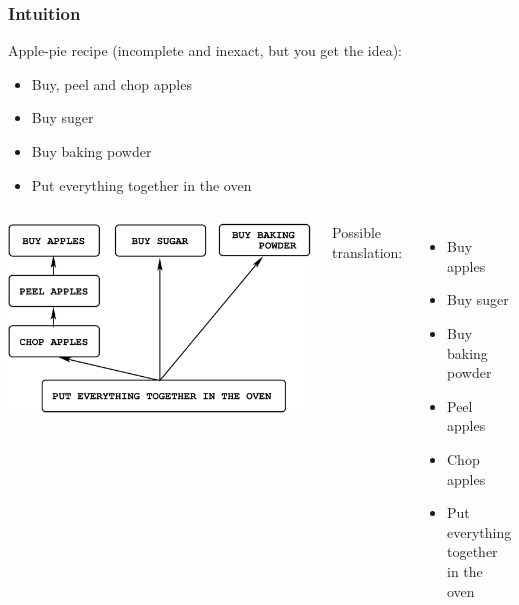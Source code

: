\documentclass[rgb,dvipsnames]{beamer}
\begin{document}
\begin{frame}[fragile,t]
  \frametitle{Intuition}

Apple-pie recipe (incomplete and inexact, but you get the idea):
\begin{itemize}
    \item Buy, peel and chop apples
    \item Buy suger
    \item Buy baking powder
    \item Put everything together in the oven
\end{itemize}
    \bigskip

\begin{columns}
\pause

\includegraphics[height=0.45\paperheight]{figures/apple-pie}

\pause
Possible translation:
\begin{itemize}
    \item Buy apples
    \item Buy suger
    \item Buy baking powder
    \item Peel apples
    \item Chop apples
    \item Put everything together in the oven
\end{itemize}
\end{columns}


\end{frame}
\end{document}
